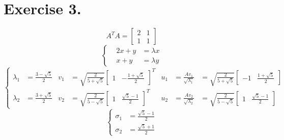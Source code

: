 \documentclass[12pt, a4paper, oneside]{article}
\begin{document}
    \section*{Exercise 3.}
        $$
            A^TA=\begin{bmatrix}
                2 & 1\\
                1 & 1
            \end{bmatrix}
        $$
        $$
            \left\{\begin{aligned}
                & 2x + y &= \lambda x\\
                & x + y &= \lambda y
            \end{aligned}\right.
        $$
        $$
            \left\{\begin{aligned}
                \lambda_1 &= \frac{3-\sqrt5}{2} & v_1 &= \sqrt{\frac{2}{5+\sqrt{5}}}\begin{bmatrix}
                    1 & -\frac{1+\sqrt{5}}{2}
                \end{bmatrix}^T & u_1 &= \frac{Av_1}{\sqrt{\lambda_1}} &=\sqrt{\frac{2}{5+\sqrt{5}}}\begin{bmatrix}
                    -1 & \frac{1+\sqrt{5}}{2}
                \end{bmatrix}\\
                \lambda_2 &= \frac{3+\sqrt5}{2} & v_2 &= \sqrt{\frac{2}{5-\sqrt{5}}}\begin{bmatrix}
                    1 & \frac{\sqrt{5}-1}{2}
                \end{bmatrix}^T & u_2 &= \frac{Av_2}{\sqrt{\lambda_2}} &=\sqrt{\frac{2}{5-\sqrt{5}}}\begin{bmatrix}
                    1 & \frac{\sqrt{5}-1}{2}
                \end{bmatrix}
            \end{aligned}\right.
        $$
        $$
            \left\{\begin{aligned}
                \sigma_1 &= \frac{\sqrt{5} - 1}{2}\\
                \sigma_2 &= \frac{\sqrt{5} + 1}{2}
            \end{aligned}\right.
        $$
\end{document}
